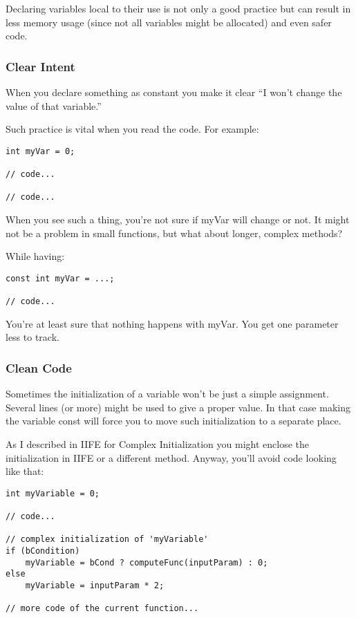 Declaring variables local to their use is not only a good practice but can result in less memory usage (since not all variables might be allocated) and even safer code. 

\subsubsection{Clear Intent}

When you declare something as constant you make it clear “I won’t change the value of that variable.” 

Such practice is vital when you read the code. For example:

\begin{verbatim}
int myVar = 0;

// code...

// code...
\end{verbatim}

When you see such a thing, you’re not sure if myVar will change or not. It might not be a problem in small functions, but what about longer, complex methods?

While having:

\begin{verbatim}
const int myVar = ...;

// code...
\end{verbatim}

You’re at least sure that nothing happens with myVar. You get one parameter less to track.

\subsubsection{Clean Code}

Sometimes the initialization of a variable won’t be just a simple assignment. Several lines (or more) might be used to give a proper value. In that case making the variable const will force you to move such initialization to a separate place.

As I described in IIFE for Complex Initialization you might enclose the initialization in IIFE or a different method. Anyway, you’ll avoid code looking like that:

\begin{verbatim}
int myVariable = 0;

// code... 

// complex initialization of 'myVariable'
if (bCondition)
    myVariable = bCond ? computeFunc(inputParam) : 0;
else
    myVariable = inputParam * 2;

// more code of the current function...
\end{verbatim}

